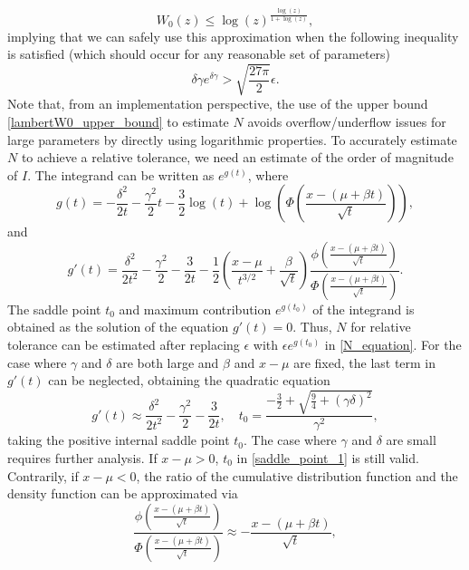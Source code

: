\documentclass[10pt,a4paper,oneside]{article}
\numberwithin{equation}{section}
\begin{document}
\begin{equation}\label{lambertW0_upper_bound}
W_0(z) \le \log(z)^{\tfrac{\log(z)}{1 + \log(z)}},
\end{equation}
implying that we can safely use this approximation when the following inequality is satisfied (which should occur for any reasonable set of parameters)
\begin{equation}
\delta \gamma e^{\delta\gamma} > \sqrt{\frac{27 \pi}{2}} \epsilon.
\end{equation}
Note that, from an implementation perspective, the use of the upper bound  \eqref{lambertW0_upper_bound} to estimate $N$ avoids overflow/underflow issues for large parameters by directly using logarithmic properties. 
To accurately estimate $N$ to achieve a relative tolerance, we need an estimate of the order of magnitude of $I$. The integrand can be written as $e^{g(t)}$, where
\begin{equation}
g(t) = -\frac{\delta^2}{2t} - \frac{\gamma^2}{2}t - \frac{3}{2}\log(t) + \log\left(\Phi\left(\frac{x - (\mu +\beta t)}{\sqrt{t}}\right)\right),
\end{equation}
and
\begin{equation}\label{saddle_point_equation}
g'(t) = \frac{\delta^2}{2t^2} -\frac{\gamma^2}{2} -\frac{3}{2t} -\frac{1}{2}\left(\frac{x-\mu}{t^{3/2}} + \frac{\beta}{\sqrt{t}} \right)\frac{\phi\left(\frac{x - (\mu +\beta t)}{\sqrt{t}}\right)}{\Phi\left(\frac{x - (\mu +\beta t)}{\sqrt{t}}\right)}.
\end{equation}
The saddle point $t_0$ and maximum contribution $e^{g(t_0)}$ of the integrand is obtained as the solution of the equation $g'(t) = 0$. Thus, $N$ for relative tolerance can be estimated after replacing $\epsilon$ with $\epsilon e^{g(t_0)}$ in \eqref{N_equation}. For the case where $\gamma$ and $\delta$ are both large and $\beta$ and $x-\mu$ are fixed, the last term in $g'(t)$ can be neglected, obtaining the quadratic equation
\begin{equation}\label{saddle_point_1}
g'(t) \approx \frac{\delta^2}{2t^2} -\frac{\gamma^2}{2} -\frac{3}{2t}, \quad t_0 = \frac{-\frac{3}{2} + \sqrt{\frac{9}{4} + (\gamma \delta)^2}}{\gamma^2},
\end{equation}
taking the positive internal saddle point $t_0$. The case where $\gamma$ and $\delta$ are small requires further analysis. If $x-\mu > 0$, $t_0$ in \eqref{saddle_point_1} is still valid. Contrarily, if $x -\mu < 0$, the ratio of the cumulative distribution function and the density function can be approximated via
\begin{equation*}
\frac{\phi\left(\frac{x - (\mu+ \beta t)}{\sqrt{t}}\right)}{\Phi\left(\frac{x - (\mu + \beta t)}{\sqrt{t}}\right)} \approx -\frac{x - (\mu + \beta t)}{\sqrt{t}},
\end{equation*}
\end{document}
